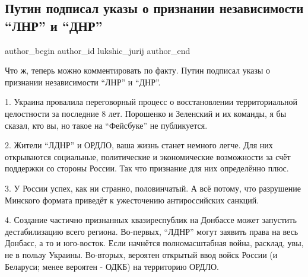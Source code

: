  
 
 
 
 
 
\subsection{Путин подписал указы о признании независимости \enquote{ЛНР} и \enquote{ДНР}}
\label{sec:21_02_2022.fb.lukshic_jurij.1.putin_lnr_dnr}
 
\ifcmt
 author_begin
   author_id lukshic_jurij
 author_end
\fi

Что ж, теперь можно комментировать по факту. Путин подписал указы о признании
независимости \enquote{ЛНР} и \enquote{ДНР}.

1. Украина провалила переговорный процесс о восстановлении территориальной
целостности за последние 8 лет. Порошенко и Зеленский и их команды, я бы
сказал, кто вы, но такое на \enquote{Фейсбуке} не публикуется.

2. Жители \enquote{ЛДНР} и ОРДЛО, ваша жизнь станет немного легче. Для них открываются
социальные, политические и экономические возможности за счёт поддержки со
стороны России. Так что признание для них определённо плюс.

3. У России успех, как ни странно, половинчатый. А всё потому, что разрушение
Минского формата приведёт к ужесточению антироссийских санкций. 

4. Создание частично признанных квазиреспублик на Донбассе может запустить
дестабилизацию всего региона. Во-первых, \enquote{ЛДНР} могут заявить права на весь
Донбасс, а то и юго-восток. Если начнётся полномасштабная война, расклад, увы,
не в пользу Украины. Во-вторых, вероятен открытый ввод войск России (и
Беларуси; менее вероятен - ОДКБ) на территорию ОРДЛО.
